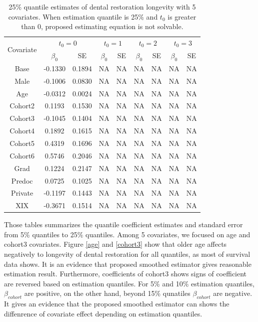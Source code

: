 \documentclass[12pt]{article}
\begin{document}
	\begin{table}[H]
		\caption{25\% quantile estimates of dental restoration longevity with 5 covariates. When estimation quantile is 25\% and $t_0$ is greater than 0, proposed estimating equation is not solvable.}
		\centering
		\begin{tabular}{|c|c|c|c|c|c|c|c|c|}
			\hline
			\multirow{2}{*}{Covariate} & \multicolumn{2}{c|}{$t_0=0$} & \multicolumn{2}{c|}{$t_0=1$} & \multicolumn{2}{c|}{$t_0=2$} & \multicolumn{2}{c|}{$t_0=3$}\\ 
			\cline{2-9}
			& $\beta_0$ & SE & $\beta_0$ & SE & $\beta_0$ & SE & $\beta_0$ & SE\\
			\hline\hline
			Base & -0.1330 & 0.1894 & NA & NA & NA & NA & NA & NA \\ 
			Male & -0.1006 & 0.0830 & NA & NA & NA & NA & NA & NA \\ 
			Age & -0.0312 & 0.0024 & NA & NA & NA & NA & NA & NA \\ 
			Cohort2 & 0.1193 & 0.1530 & NA & NA & NA & NA & NA & NA \\  
			Cohort3 & -0.1045 & 0.1404 & NA & NA & NA & NA & NA & NA \\  
			Cohort4 & 0.1892 & 0.1615 & NA & NA & NA & NA & NA & NA \\  
			Cohort5 & 0.4319 & 0.1696 & NA & NA & NA & NA & NA & NA \\ 
			Cohort6 & 0.5746 & 0.2046 & NA & NA & NA & NA & NA & NA \\ 
			Grad & 0.1224 & 0.2147 & NA & NA & NA & NA & NA & NA \\ 
			Predoc & 0.0725 & 0.1025 & NA & NA & NA & NA & NA & NA \\ 
			Private & -0.1197 & 0.1443 & NA & NA & NA & NA & NA & NA \\ 
			XIX & -0.3671 & 0.1514 & NA & NA & NA & NA & NA & NA \\ 
			\hline
		\end{tabular}
	\end{table}

	\noindent Those tables summarizes the quantile coefficient estimates and standard error from 5\% quantiles to 25\% quantiles. Among 5 covariates, we focused on age and cohort3 covariates. Figure \ref{age} and \ref{cohort3} show that older age affects negatively to longevity of dental restoration for all quantiles, as most of survival data shows. It is an evidence that proposed smoothed estimator gives reasonable estimation result. Furthermore, coefficients of cohort3 shows signs of coefficient are reversed based on estimation quantiles. For 5\% and 10\% estimation quantiles, $\beta_{cohort}$ are positive, on the other hand, beyond 15\% qunatiles $\beta_{cohort}$ are negative. It gives an evidence that the proposed smoothed estimator can shows the diffenrence of covariate effect depending on estimation quantiles.
\end{document}
